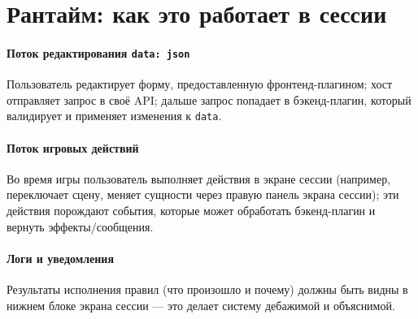 \section{Рантайм: как это работает в сессии}\label{sec:rules-and-plugins:runtime}

\paragraph{Поток редактирования \texttt{data: json}}
Пользователь редактирует форму, предоставленную фронтенд-плагином; хост отправляет запрос в своё API; дальше запрос попадает в бэкенд-плагин, который валидирует и применяет изменения к \texttt{data}. 

\paragraph{Поток игровых действий}
Во время игры пользователь выполняет действия в экране сессии (например, переключает сцену, меняет сущности через правую панель экрана сессии); эти действия порождают события, которые может обработать бэкенд-плагин и вернуть эффекты/сообщения. 

\paragraph{Логи и уведомления}
Результаты исполнения правил (что произошло и почему) должны быть видны в нижнем блоке экрана сессии — это делает систему дебажимой и объяснимой. 
